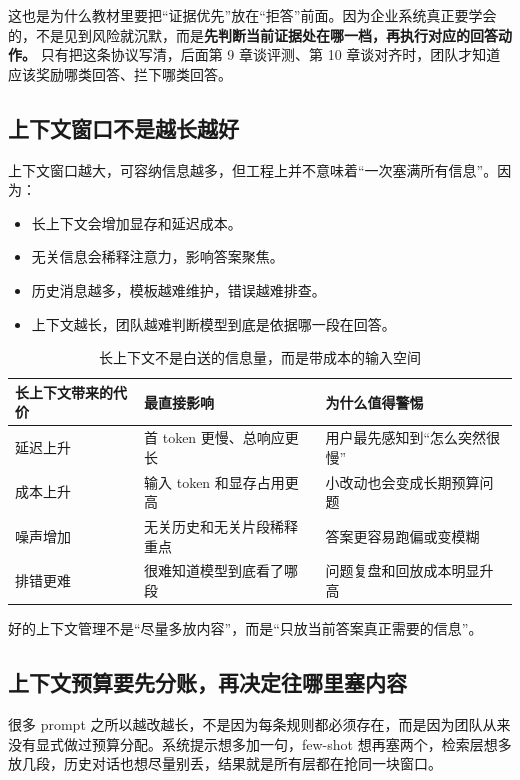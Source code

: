 这也是为什么教材里要把“证据优先”放在“拒答”前面。因为企业系统真正要学会的，不是见到风险就沉默，而是\textbf{先判断当前证据处在哪一档，再执行对应的回答动作。} 只有把这条协议写清，后面第 9 章谈评测、第 10 章谈对齐时，团队才知道应该奖励哪类回答、拦下哪类回答。

\subsection{上下文窗口不是越长越好}
上下文窗口越大，可容纳信息越多，但工程上并不意味着“一次塞满所有信息”。因为：
\begin{itemize}
  \item 长上下文会增加显存和延迟成本。
  \item 无关信息会稀释注意力，影响答案聚焦。
  \item 历史消息越多，模板越难维护，错误越难排查。
  \item 上下文越长，团队越难判断模型到底是依据哪一段在回答。
\end{itemize}

\begin{table}[H]
\centering
\small
\begin{tabularx}{\textwidth}{>{\raggedright\arraybackslash}p{3.2cm}>{\raggedright\arraybackslash}p{3.5cm}>{\raggedright\arraybackslash}X}
\toprule
\textbf{长上下文带来的代价} & \textbf{最直接影响} & \textbf{为什么值得警惕} \\
\midrule
延迟上升 & 首 token 更慢、总响应更长 & 用户最先感知到“怎么突然很慢” \\
成本上升 & 输入 token 和显存占用更高 & 小改动也会变成长期预算问题 \\
噪声增加 & 无关历史和无关片段稀释重点 & 答案更容易跑偏或变模糊 \\
排错更难 & 很难知道模型到底看了哪段 & 问题复盘和回放成本明显升高 \\
\bottomrule
\end{tabularx}
\caption{长上下文不是白送的信息量，而是带成本的输入空间}
\label{tab:long-context-costs}
\end{table}

好的上下文管理不是“尽量多放内容”，而是“只放当前答案真正需要的信息”。

\subsection{上下文预算要先分账，再决定往哪里塞内容}
很多 prompt 之所以越改越长，不是因为每条规则都必须存在，而是因为团队从来没有显式做过预算分配。系统提示想多加一句，few-shot 想再塞两个，检索层想多放几段，历史对话也想尽量别丢，结果就是所有层都在抢同一块窗口。

